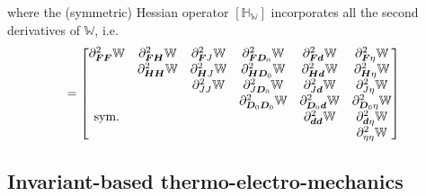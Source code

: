 %
where the (symmetric) Hessian operator  $[\mathbb{H}_{\mathbb{W}}]$ incorporates all the second derivatives of $\mathbb{W}$, i.e.
%
\begin{equation}
[\mathbb{H}_{\mathbb{W}}]=\begin{bmatrix}
\partial^2_{\vect{F}\vect{F}}\mathbb{W}  &  
\partial^2_{\vect{F}\vect{H}}\mathbb{W}  &
\partial^2_{\vect{F}J}\mathbb{W}&
\partial^2_{\vect{F}\vect{D}_0}\mathbb{W}&
\partial^2_{\vect{F}\vect{d}}\mathbb{W}&
\partial^2_{\vect{F}\eta}\mathbb{W}\\
%
%
&
\partial^2_{\vect{H}\vect{H}}\mathbb{W}  &
\partial^2_{\vect{H}J}\mathbb{W}&
\partial^2_{\vect{H}\vect{D}_0}\mathbb{W}&
\partial^2_{\vect{H}\vect{d}}\mathbb{W}&
\partial^2_{\vect{H}\eta}\mathbb{W}\\
%
%
& &
\partial^2_{JJ}\mathbb{W}&
\partial^2_{J\vect{D}_0}\mathbb{W}&
\partial^2_{J\vect{d}}\mathbb{W}&
\partial^2_{J\eta}\mathbb{W}\\
%
%
&&&\partial^2_{\vect{D}_0\vect{D}_0}\mathbb{W}&
\partial^2_{\vect{D}_0\vect{d}}\mathbb{W}&
\partial^2_{\vect{D}_0\eta}\mathbb{W}\\
%
%
\text{sym.}&&&&\partial^2_{\vect{d}\vect{d}}\mathbb{W}&
\partial^2_{\vect{d}\eta}\mathbb{W}\\
%
%
&&&&&\partial^2_{\eta\eta}\mathbb{W}
%
\end{bmatrix}
\end{equation}



\subsection{Invariant-based thermo-electro-mechanics}\label{subsec:InvariantFormulation}


